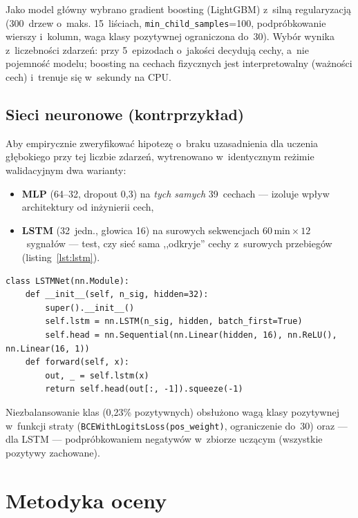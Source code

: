 \documentclass[11pt,a4paper]{article}
\begin{document}
Jako model główny wybrano gradient boosting (LightGBM) z~silną regularyzacją
(300~drzew o~maks. 15~liściach, \texttt{min\_child\_samples}=100,
podpróbkowanie wierszy i~kolumn, waga klasy pozytywnej ograniczona do~30).
Wybór wynika z~liczebności zdarzeń: przy 5~epizodach o~jakości decydują cechy,
a~nie pojemność modelu; boosting na cechach fizycznych jest interpretowalny
(ważności cech) i~trenuje się w~sekundy na CPU.

\subsection{Sieci neuronowe (kontrprzykład)}

Aby empirycznie zweryfikować hipotezę o~braku uzasadnienia dla uczenia
głębokiego przy tej liczbie zdarzeń, wytrenowano w~identycznym reżimie
walidacyjnym dwa warianty:
\begin{itemize}
  \item \textbf{MLP} (64--32, dropout 0{,}3) na \emph{tych samych} 39~cechach
        --- izoluje wpływ architektury od inżynierii cech,
  \item \textbf{LSTM} (32~jedn., głowica 16) na surowych sekwencjach
        $60\,\mathrm{min}\times 12$~sygnałów --- test, czy sieć sama
        ,,odkryje'' cechy z~surowych przebiegów (listing~\ref{lst:lstm}).
\end{itemize}

\begin{lstlisting}[caption={Architektura LSTM (\texttt{src/nn\_experiment.py}).},label={lst:lstm}]
class LSTMNet(nn.Module):
    def __init__(self, n_sig, hidden=32):
        super().__init__()
        self.lstm = nn.LSTM(n_sig, hidden, batch_first=True)
        self.head = nn.Sequential(nn.Linear(hidden, 16), nn.ReLU(), nn.Linear(16, 1))
    def forward(self, x):
        out, _ = self.lstm(x)
        return self.head(out[:, -1]).squeeze(-1)
\end{lstlisting}

Niezbalansowanie klas (0{,}23\% pozytywnych) obsłużono wagą klasy pozytywnej
w~funkcji straty (\texttt{BCEWithLogitsLoss(pos\_weight)}, ograniczenie
do~30) oraz --- dla LSTM --- podpróbkowaniem negatywów w~zbiorze uczącym
(wszystkie pozytywy zachowane).

\section{Metodyka oceny}
\end{document}
